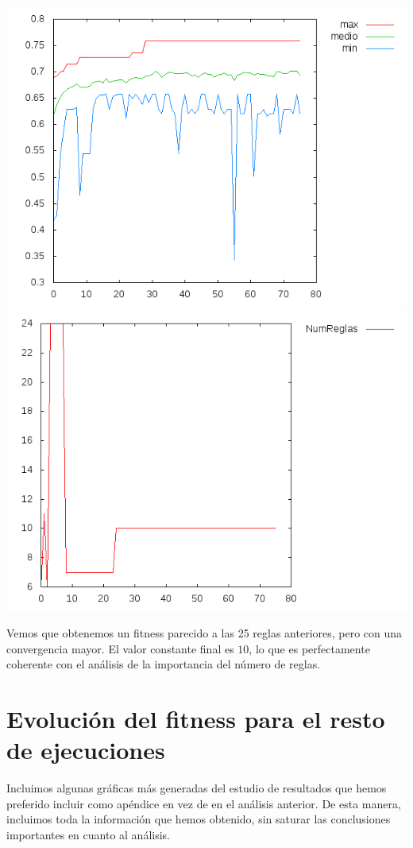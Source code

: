 \documentclass[nochap]{apuntes}
\begin{document}
\begin{center}
\includegraphics[scale=0.4]{tex/img/g76_p76_ReemplazoTotal_SeleccionProporcionalAlFitness_reg11.png}
\includegraphics[scale=0.4]{tex/img/g76_p76_ReemplazoTotal_SeleccionProporcionalAlFitness_reg11_reglas.png}
\end{center}

Vemos que obtenemos un fitness parecido a las 25 reglas anteriores, pero con una convergencia mayor. El valor constante final es $10$, lo que es perfectamente coherente con el análisis de la importancia del número de reglas.

\section{Evolución del fitness para el resto de ejecuciones}

Incluimos algunas gráficas más generadas del estudio de resultados que hemos preferido incluir como apéndice en vez de en el análisis anterior. De esta manera, incluimos toda la información que hemos obtenido, sin saturar las conclusiones importantes en cuanto al análisis.
\end{document}
